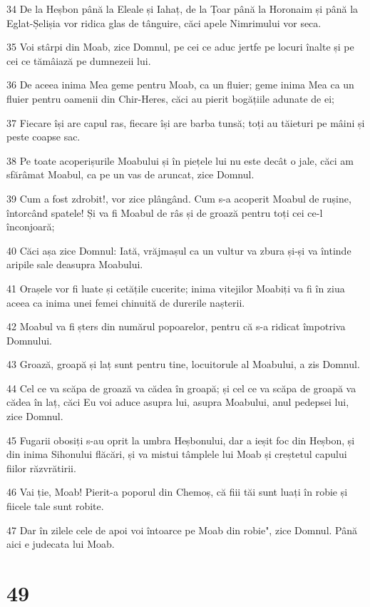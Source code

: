\par 34 De la Heșbon până la Eleale și Iahaț, de la Țoar până la Horonaim și până la Eglat-Șelișia vor ridica glas de tânguire, căci apele Nimrimului vor seca.
\par 35 Voi stârpi din Moab, zice Domnul, pe cei ce aduc jertfe pe locuri înalte și pe cei ce tămâiază pe dumnezeii lui.
\par 36 De aceea inima Mea geme pentru Moab, ca un fluier; geme inima Mea ca un fluier pentru oamenii din Chir-Heres, căci au pierit bogățiile adunate de ei;
\par 37 Fiecare își are capul ras, fiecare își are barba tunsă; toți au tăieturi pe mâini și peste coapse sac.
\par 38 Pe toate acoperișurile Moabului și în piețele lui nu este decât o jale, căci am sfărâmat Moabul, ca pe un vas de aruncat, zice Domnul.
\par 39 Cum a fost zdrobit!, vor zice plângând. Cum s-a acoperit Moabul de rușine, întorcând spatele! Și va fi Moabul de râs și de groază pentru toți cei ce-l înconjoară;
\par 40 Căci așa zice Domnul: Iată, vrăjmașul ca un vultur va zbura și-și va întinde aripile sale deasupra Moabului.
\par 41 Orașele vor fi luate și cetățile cucerite; inima vitejilor Moabiți va fi în ziua aceea ca inima unei femei chinuită de durerile nașterii.
\par 42 Moabul va fi șters din numărul popoarelor, pentru că s-a ridicat împotriva Domnului.
\par 43 Groază, groapă și laț sunt pentru tine, locuitorule al Moabului, a zis Domnul.
\par 44 Cel ce va scăpa de groază va cădea în groapă; și cel ce va scăpa de groapă va cădea în laț, căci Eu voi aduce asupra lui, asupra Moabului, anul pedepsei lui, zice Domnul.
\par 45 Fugarii obosiți s-au oprit la umbra Heșbonului, dar a ieșit foc din Heșbon, și din inima Sihonului flăcări, și va mistui tâmplele lui Moab și creștetul capului fiilor răzvrătirii.
\par 46 Vai ție, Moab! Pierit-a poporul din Chemoș, că fiii tăi sunt luați în robie și fiicele tale sunt robite.
\par 47 Dar în zilele cele de apoi voi întoarce pe Moab din robie", zice Domnul. Până aici e judecata lui Moab.

\chapter{49}

